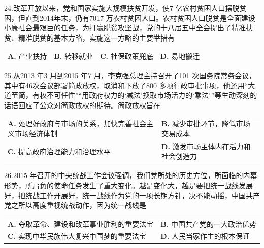 \documentclass[UTF8,11pt]{ctexart}
\begin{document}
24.改革开放以来，党和国家实施大规模扶贫开发，使7 亿农村贫困人口摆脱贫困，但直到2014年末，仍有7017 万农村贫困人口。农村贫困人口脱贫是全面建设小康社会最艰巨的任务，为打赢脱贫攻坚战，党的十八届五中全会提出了精准扶贫、精准脱贫的基本方略，实施这一方略的主要举措有


\begin{center}\begin{tabular}{>{\raggedright\arraybackslash}p{\dimexpr(\linewidth-8\tabcolsep)/4\relax}>{\raggedright\arraybackslash}p{\dimexpr(\linewidth-8\tabcolsep)/4\relax}>{\raggedright\arraybackslash}p{\dimexpr(\linewidth-8\tabcolsep)/4\relax}>{\raggedright\arraybackslash}p{\dimexpr(\linewidth-8\tabcolsep)/4\relax}}
\textbf{A.} 产业扶持 & \textbf{B.} 转移就业 & \textbf{C.} 社保政策兜底 & \textbf{D.} 易地搬迁\\[.35em]\end{tabular}\end{center}

25.从2013 年3 月到2015 年7 月，李克强总理主持召开了101 次国务院常务会议，其中有46次会议部署简政放权，取消和下放了800 多项行政审批事项，他还用“大道至简，有权不可任性”“用政府权力的‘减法’换取市场活力的‘乘法’”等生动深刻的话语回应了公众对简政放权的期待。简政放权旨在


\begin{center}\begin{tabular}{>{\raggedright\arraybackslash}p{\dimexpr(\linewidth-4\tabcolsep)/2\relax}>{\raggedright\arraybackslash}p{\dimexpr(\linewidth-4\tabcolsep)/2\relax}}
\textbf{A.} 处理好政府与市场的关系，加快完善社会主义市场经济体制 & \textbf{B.} 减少审批环节，降低市场交易成本\\[.35em]
\textbf{C.} 提高政府治理能力和治理水平 & \textbf{D.} 激发市场主体内在活力和社会创造力\\[.35em]\end{tabular}\end{center}

26.2015 年召开的中央统战工作会议强调，我们党所处的历史方位，所面临的内幕形势，所肩负的使命任务发生了重大变化。越是变化大，越是要把统一战线发展好，把统战工作开展好，统一战线作为党的一项长期方针，决不能动摇，中国共产党之所以高度重视统战动作，因为统一战线是


\begin{center}\begin{tabular}{>{\raggedright\arraybackslash}p{\dimexpr(\linewidth-4\tabcolsep)/2\relax}>{\raggedright\arraybackslash}p{\dimexpr(\linewidth-4\tabcolsep)/2\relax}}
\textbf{A.} 夺取革命、建设和改革事业胜利的重要法宝 & \textbf{B.} 中国共产党的一大政治优势\\[.35em]
\textbf{C.} 实现中华民族伟大复兴中国梦的重要法宝 & \textbf{D.} 人民当家作主的根本保证\\[.35em]\end{tabular}\end{center}
\end{document}
